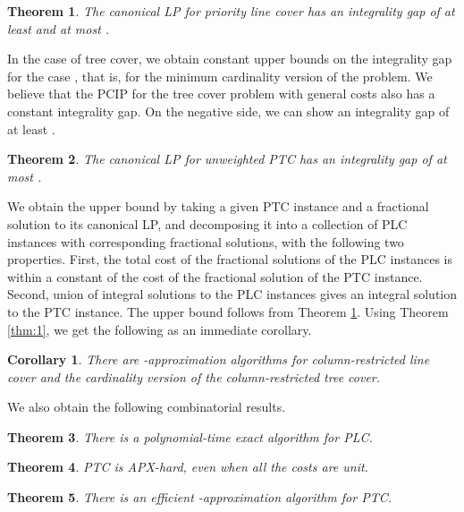 \documentclass[11pt]{article}
\newtheorem{theorem}{Theorem}
\newtheorem{corollary}{Corollary}
\newcommand{\1}{\mathbb{1}}
\begin{document}
\begin{theorem}\label{thm:plc-gap}
  The canonical LP for priority line cover has an integrality gap of at least  and 
  at most .
\end{theorem}

In the case of tree cover, we obtain constant upper bounds on
the integrality gap for the case , that is, for the
minimum cardinality version of the problem.  We believe that the PCIP
for the tree cover problem with general costs also has a constant
integrality gap.  On the negative side, we can show an integrality gap
of at least .

\begin{theorem}\label{thm:ptc-gap}
  The canonical LP for {\em unweighted} PTC has an integrality gap of
  at most .
\end{theorem}

We obtain the upper bound by taking a given PTC instance and a
fractional solution to its canonical LP, and decomposing it into a
collection of PLC instances with corresponding fractional solutions,
with the following two properties. First, the total cost of the
fractional solutions of the PLC instances is within a constant of the
cost of the fractional solution of the PTC instance. Second, union of
integral solutions to the PLC instances gives an integral solution to
the PTC instance. The upper bound follows from Theorem
\ref{thm:plc-gap}.  Using Theorem \ref{thm:1}, we get the following as
an immediate corollary.

\begin{corollary}
  There are -approximation algorithms for column-restricted line
  cover and the cardinality version of the column-restricted tree
  cover.
\end{corollary}

We also obtain the following combinatorial results.

\begin{theorem}\label{thm:plc-exact}
  There is a polynomial-time exact algorithm for PLC.
\end{theorem}

\begin{theorem}\label{thm:ptc-hard}
  PTC is APX-hard, even when all the costs are unit.
\end{theorem}

\begin{theorem}\label{thm:ptc-apx}
  There is an efficient -approximation algorithm for 
  PTC. 
\end{theorem}
\end{document}
